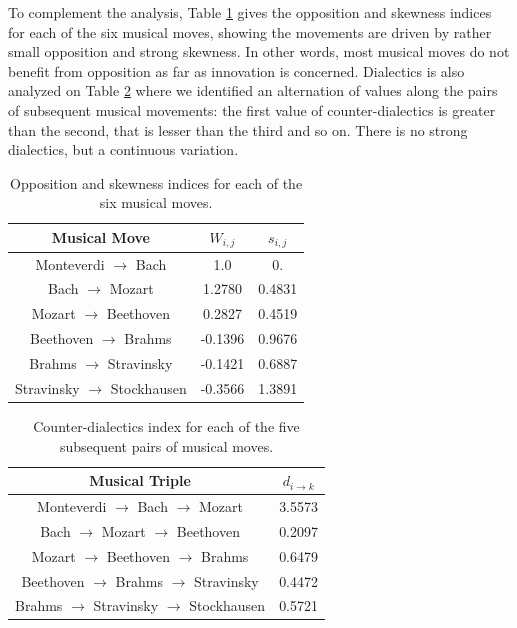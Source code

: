 \documentclass[
 aip,
 jmp,
 amsmath,amssymb,
 reprint,
]{revtex4-1}
\begin{document}
To complement the analysis, Table \ref{tab:tableOI} gives the
opposition and skewness indices for each of the six musical moves,
showing the movements are driven by rather small opposition and strong
skewness. In other words, most musical moves do not benefit from
opposition as far as innovation is concerned. Dialectics is also analyzed on Table
\ref{tab:tableE} where we identified an alternation of values along
the pairs of subsequent musical movements: the first value of
counter-dialectics is greater than the second, that is lesser than the
third and so on. There is no strong
dialectics, but a continuous variation.

\begin{table}[ht]
\caption{\label{tab:tableOI}Opposition and skewness indices for each
of the six musical moves.}

\begin{tabular}{|c||c|c|}
\hline
Musical Move & $W_{i,j}$ & $s_{i,j}$ \\
\hline \hline

 Monteverdi $\to$ Bach             &   1.0     &  0.      \\
 Bach $\to$ Mozart                 &   1.2780  &  0.4831  \\
 Mozart $\to$ Beethoven            &   0.2827  &  0.4519  \\
 Beethoven $\to$ Brahms            &  -0.1396  &  0.9676  \\
 Brahms $\to$ Stravinsky           &  -0.1421  &  0.6887  \\
 Stravinsky $\to$ Stockhausen      &  -0.3566  &  1.3891  \\

\hline
\end{tabular}
\end{table}

\begin{table}[ht]
\caption{\label{tab:tableE} Counter-dialectics index for each
of the five subsequent pairs of musical moves.}

\begin{tabular}{|c||c|}
\hline
Musical Triple & $d_{i \rightarrow k}$ \\
\hline \hline

 Monteverdi $\to$ Bach $\to$ Mozart          &     3.5573  \\
 Bach $\to$ Mozart $\to$ Beethoven           &     0.2097  \\
 Mozart $\to$ Beethoven $\to$ Brahms         &     0.6479  \\
 Beethoven $\to$ Brahms $\to$ Stravinsky     &     0.4472  \\
 Brahms $\to$ Stravinsky $\to$ Stockhausen   &     0.5721  \\

\hline
\end{tabular}
\end{table}
\end{document}

